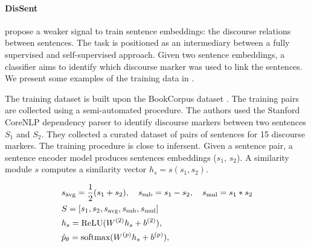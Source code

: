 \paragraph{DisSent} \textcite{nie_19} propose a weaker signal to train sentence embeddings: the discourse relations between sentences. The task is positioned as an intermediary between a fully supervised and self-supervised approach. Given two sentence embeddings, a classifier aims to identify which discourse marker was used to link the sentences.  We present some examples of the training data in .

The training dataset is built upon the BookCorpus dataset \parencite{zhu_15}. The training pairs are collected using a semi-automated procedure. The authors used the Stanford CoreNLP dependency parser \parencite{schuster_16} to identify discourse markers between two sentences $S_1$ and $S_2$. They collected a curated dataset of  pairs of sentences for 15 discourse markers. The training procedure is close to infersent. Given a sentence pair, a sentence encoder model produces sentences embeddings ($s_1$, $s_2$). A similarity module $s$ computes a similarity vector $h_s = s(s_1, s_2)$. 

\begin{equation}
\begin{split}
    &s_{\text{avg}} = \frac{1}{2} (s_1 + s_2), ~~~s_{\text{sub}} = s_1 - s_2, ~~~s_{\text{mul}} = s_1 * s_2 \\
    &S = [s_1, s_2, s_{\text{avg}}, s_{\text{sub}}, s_{\text{mul}}]\\
    &h_s = \textrm{ReLU}(W^{(2)}h_s + b^{(2)}), \\
    &\hat{p}_{\theta} = \text{softmax}(W^{(p)}h_s + b^{(p)}), \\
\end{split}
\labeq{similarity:2}
\end{equation}

